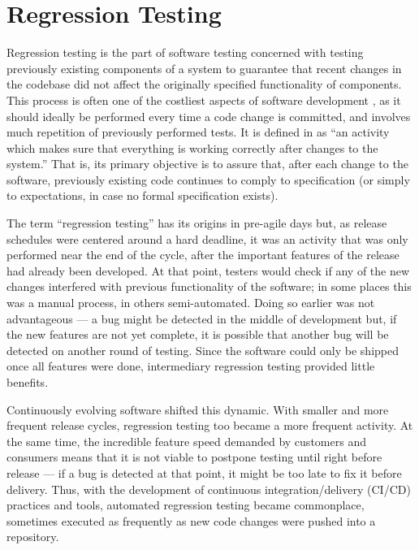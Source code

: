 \section{Regression Testing}
\label{sec:regression}

Regression testing is the part of software testing concerned with testing previously existing components of a system to guarantee that recent changes in the codebase did not affect the originally specified functionality of components.
This process is often one of the costliest aspects of software development \cite{rothermel_improving_2018}, as it should ideally be performed every time a code change is committed, and involves much repetition of previously performed tests.
It is defined in \cite{minhas_regression_2017} as ``an activity which makes sure that everything is working correctly after changes to the system.''
That is, its primary objective is to assure that, after each change to the software, previously existing code continues to comply to specification (or simply to expectations, in case no formal specification exists).

The term ``regression testing'' has its origins in pre-agile days but, as release schedules were centered around a hard deadline, it was an activity that was only performed near the end of the cycle, after the important features of the release had already been developed.
At that point, testers would check if any of the new changes interfered with previous functionality of the software; in some places this was a manual process, in others semi-automated.
Doing so earlier was not advantageous — a bug might be detected in the middle of development but, if the new features are not yet complete, it is possible that another bug will be detected on another round of testing.
Since the software could only be shipped once all features were done, intermediary regression testing provided little benefits.

Continuously evolving software shifted this dynamic.
With smaller and more frequent release cycles, regression testing too became a more frequent activity.
At the same time, the incredible feature speed demanded by customers and consumers means that it is not viable to postpone testing until right before release — if a bug is detected at that point, it might be too late to fix it before delivery.
Thus, with the development of continuous integration/delivery (CI/CD) practices and tools, automated regression testing became commonplace, sometimes executed as frequently as new code changes were pushed into a repository.

